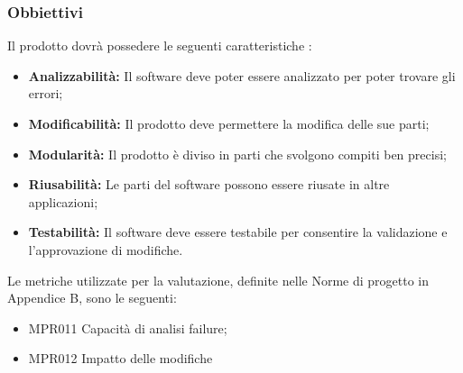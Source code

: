 \subsubsection{Obbiettivi } Il prodotto dovrà possedere le seguenti caratteristiche :
\begin{itemize}
	\item \textbf{Analizzabilità:} Il software deve poter essere analizzato per poter trovare gli errori;
	\item \textbf{Modificabilità:} Il prodotto deve permettere la modifica delle sue parti;
	\item \textbf{Modularità:} Il prodotto è diviso in parti che svolgono compiti ben precisi;
	\item \textbf{Riusabilità:} Le parti del software possono essere riusate in altre applicazioni;
	\item \textbf{Testabilità:} Il software deve essere testabile per consentire la validazione e l'approvazione di modifiche.
\end{itemize}	Le metriche utilizzate per la valutazione, definite nelle Norme di progetto in Appendice B, sono le seguenti:
\begin{itemize}
	\item MPR011 Capacità di analisi failure;
	\item MPR012 Impatto delle modifiche
\end{itemize}

